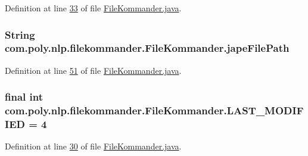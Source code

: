 Definition at line \hyperlink{L33}{33} of file \hyperlink{}{File\-Kommander.\-java}.

\hypertarget{classcom_1_1poly_1_1nlp_1_1filekommander_1_1_file_kommander_a2304e5f2732e0911893782dee866ee6d}{
\subsubsection[{jape\-File\-Path}]{\setlength{\rightskip}{0pt plus 5cm}String com.\-poly.\-nlp.\-filekommander.\-File\-Kommander.\-jape\-File\-Path\hspace{0.3cm}{\ttfamily [private]}}}\label{classcom_1_1poly_1_1nlp_1_1filekommander_1_1_file_kommander_a2304e5f2732e0911893782dee866ee6d}


Definition at line \hyperlink{L51}{51} of file \hyperlink{}{File\-Kommander.\-java}.

\hypertarget{classcom_1_1poly_1_1nlp_1_1filekommander_1_1_file_kommander_a0e06efa81ab1100008a3131c6d92ceca}{
\subsubsection[{L\-A\-S\-T\-\_\-\-M\-O\-D\-I\-F\-I\-E\-D}]{\setlength{\rightskip}{0pt plus 5cm}final int com.\-poly.\-nlp.\-filekommander.\-File\-Kommander.\-L\-A\-S\-T\-\_\-\-M\-O\-D\-I\-F\-I\-E\-D = 4\hspace{0.3cm}{\ttfamily [static]}}}\label{classcom_1_1poly_1_1nlp_1_1filekommander_1_1_file_kommander_a0e06efa81ab1100008a3131c6d92ceca}


Definition at line \hyperlink{L30}{30} of file \hyperlink{}{File\-Kommander.\-java}.

